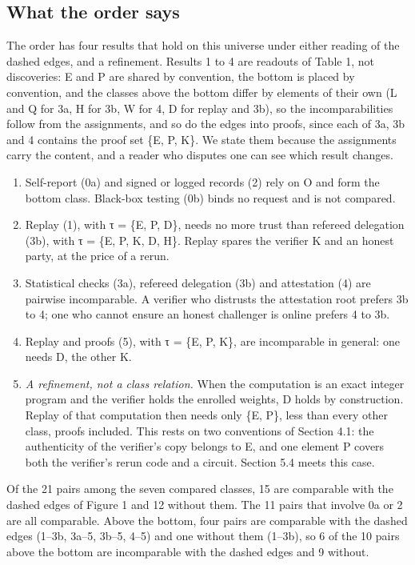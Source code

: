 \documentclass[11pt]{article}
\begin{document}
\subsection{What the order says}

The order has four results that hold on this universe under either reading of the dashed edges, and a refinement. Results 1 to 4 are readouts of Table 1, not discoveries: E and P are shared by convention, the bottom is placed by convention, and the classes above the bottom differ by elements of their own (L and Q for 3a, H for 3b, W for 4, D for replay and 3b), so the incomparabilities follow from the assignments, and so do the edges into proofs, since each of 3a, 3b and 4 contains the proof set \{E, P, K\}. We state them because the assignments carry the content, and a reader who disputes one can see which result changes.

\begin{enumerate}
\item Self-report (0a) and signed or logged records (2) rely on O and form the bottom class. Black-box testing (0b) binds no request and is not compared.
\item Replay (1), with τ = \{E, P, D\}, needs no more trust than refereed delegation (3b), with τ = \{E, P, K, D, H\}. Replay spares the verifier K and an honest party, at the price of a rerun.
\item Statistical checks (3a), refereed delegation (3b) and attestation (4) are pairwise incomparable. A verifier who distrusts the attestation root prefers 3b to 4; one who cannot ensure an honest challenger is online prefers 4 to 3b.
\item Replay and proofs (5), with τ = \{E, P, K\}, are incomparable in general: one needs D, the other K.
\item \emph{A refinement, not a class relation.} When the computation is an exact integer program and the verifier holds the enrolled weights, D holds by construction. Replay of that computation then needs only \{E, P\}, less than every other class, proofs included. This rests on two conventions of Section 4.1: the authenticity of the verifier's copy belongs to E, and one element P covers both the verifier's rerun code and a circuit. Section 5.4 meets this case.
\end{enumerate}

Of the 21 pairs among the seven compared classes, 15 are comparable with the dashed edges of Figure 1 and 12 without them. The 11 pairs that involve 0a or 2 are all comparable. Above the bottom, four pairs are comparable with the dashed edges (1--3b, 3a--5, 3b--5, 4--5) and one without them (1--3b), so 6 of the 10 pairs above the bottom are incomparable with the dashed edges and 9 without.
\end{document}
